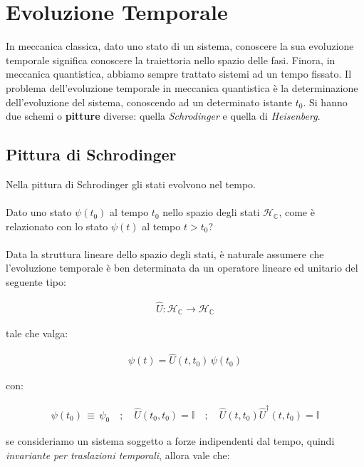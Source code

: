 \chapter{Evoluzione Temporale}
	
	In meccanica classica, dato uno stato di un sistema, conoscere la sua evoluzione temporale significa conoscere la traiettoria nello spazio delle fasi. Finora, in meccanica quantistica, abbiamo sempre trattato sistemi ad un tempo fissato. Il problema dell'evoluzione temporale in meccanica quantistica è la determinazione dell'evoluzione del sistema, conoscendo ad un determinato istante $t_0$. Si hanno due schemi o \textbf{pitture} diverse: quella \textit{Schrodinger} e quella di \textit{Heisenberg}.
	
\section{Pittura di Schrodinger}

	Nella pittura di Schrodinger gli stati evolvono nel tempo.
	\\
	\\ 
	Dato uno stato $\psi(t_0)$ al tempo $t_0$ nello spazio degli stati $\mathcal{H}_{\mathbb{C}}$, come è relazionato con lo stato $\psi(t)$ al tempo $t > t_0$?
	\\
	\\
	Data la struttura lineare dello spazio degli stati, è naturale assumere che l'evoluzione temporale è ben determinata da un operatore lineare ed unitario del seguente tipo:
	
\begin{align*}
	\hat{U} : \mathcal{H}_{\mathbb{C}} \to \mathcal{H}_{\mathbb{C}} 
\end{align*}
	
	tale che valga:
	
\begin{align*}
	\psi(t) = \hat{U}(t, t_0) \, \psi(t_0)
\end{align*}

	con:
	
\begin{align*}
	\psi(t_0) \, \equiv \, \psi_0 \quad ; \quad \hat{U}(t_0, t_0) = \mathbb{I} \quad ; \quad \hat{U}(t, t_0)\hat{U}^{\dagger}(t, t_0) =  \mathbb{I} 
\end{align*}
	
	se consideriamo un sistema soggetto a forze indipendenti dal tempo, quindi \textit{invariante per traslazioni temporali}, allora vale che:
	
